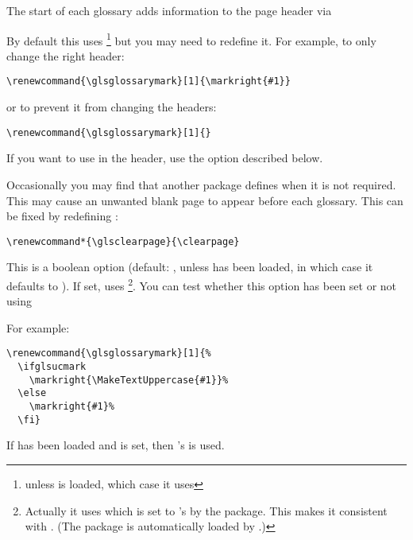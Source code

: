 \documentclass[report,inlinetitle]{nlctdoc}
\begin{document}
\begin{description}
The start of each glossary adds information to the page header via
\begin{definition}[\DescribeMacro{\glsglossarymark}]
\end{definition}
By default this uses \footnote{unless  is
loaded, which case it uses } but you may 
need to redefine it.
For example, to only change the right header:
\begin{verbatim}
\renewcommand{\glsglossarymark}[1]{\markright{#1}}
\end{verbatim}
or to prevent it from changing the headers:
\begin{verbatim}
\renewcommand{\glsglossarymark}[1]{}
\end{verbatim}
If you want  to use  in the header, use the
 option described below.

Occasionally you may find that another package defines 
\linebreak{} when it is not required. This may cause an 
unwanted blank page to appear before each glossary. This can
be fixed by redefining \DescribeMacro\glsclearpage{}:
\begin{verbatim}
\renewcommand*{\glsclearpage}{\clearpage}
\end{verbatim}

\item[\pkgopt{ucmark}] This is a boolean option (default:
, unless  has been loaded, in
which case it defaults to ). If
set,  uses
\footnote{Actually it uses
 which is set to 's 
by the
 package. This makes it consistent with
. (The  package is automatically
loaded by .)}.
You can test whether this option has been set or not using
\begin{definition}[\DescribeMacro\ifglsucmark]
  
\end{definition}
For example:
\begin{verbatim}
\renewcommand{\glsglossarymark}[1]{%
  \ifglsucmark
    \markright{\MakeTextUppercase{#1}}%
  \else
    \markright{#1}%
  \fi}
\end{verbatim}
If  has been loaded and  is set, then
's  is used.


\end{description}
\end{document}
